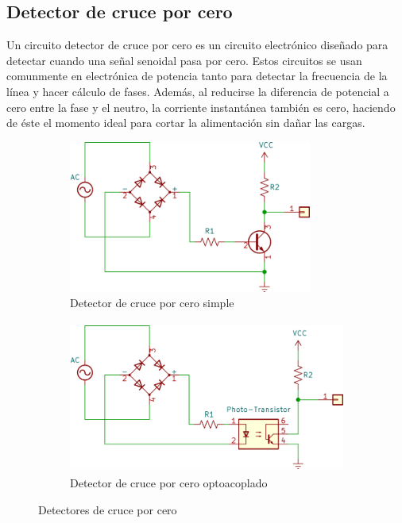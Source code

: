 %
%


\subsection{Detector de cruce por cero}%
\label{seq:intro-zeroX}
Un circuito detector de cruce por cero es un circuito electrónico diseñado para detectar cuando una señal senoidal pasa por cero.
Estos circuitos se usan comunmente en electrónica de potencia tanto para detectar la frecuencia de la línea y hacer cálculo de fases.
Además, al reducirse la diferencia de potencial a cero entre la fase y el neutro, la corriente instantánea también es cero, haciendo de éste el momento ideal para cortar la alimentación sin dañar las cargas.

\begin{figure}[H]
	\centering
	\begin{subfigure}[b]{0.5\columnwidth}
		\centering
		\includegraphics[width=\textwidth,height=5cm,keepaspectratio]{img/zcross-1.png}
		\caption{Detector de cruce por cero simple}
		\label{fig:zx1} %
	\end{subfigure}%
	\begin{subfigure}[b]{0.5\columnwidth}
		\centering
		\includegraphics[width=\textwidth,height=5cm,keepaspectratio]{img/zcross-2.png}
		\caption{Detector de cruce por cero optoacoplado}
		\label{fig:zx2} %
	\end{subfigure}
	\caption{Detectores de cruce por cero}
	\label{fig:zx} %
\end{figure}

